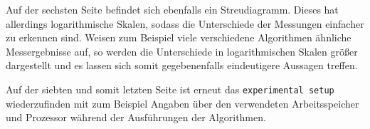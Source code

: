 Auf der sechsten Seite befindet sich ebenfalls ein Streudiagramm. Dieses hat allerdings logarithmische Skalen, sodass die Unterschiede der Messungen einfacher zu erkennen sind. Weisen zum Beispiel viele verschiedene Algorithmen ähnliche Mess\-er\-geb\-nisse auf, so werden die Unterschiede in logarithmischen Skalen größer dargestellt und es lassen sich somit gegebenenfalls eindeutigere Aussagen treffen.

Auf der siebten und somit letzten Seite ist erneut das \texttt{experimental setup} wiederzufinden mit zum Beispiel Angaben über den verwendeten Ar\-beits\-spei\-cher und Prozessor während der Ausführungen der Algorithmen.